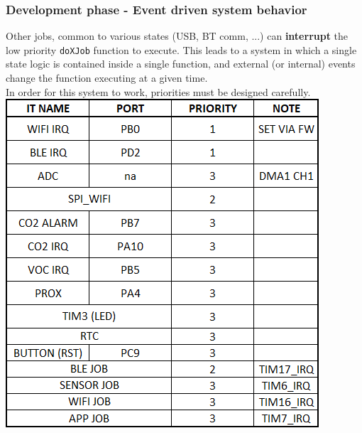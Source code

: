 \documentclass[11pt,xcolor=table,aspectratio=169]{beamer}
\begin{document}
	\begin{frame}
		\frametitle{Development phase - Event driven system behavior}
		Other jobs, common to various states (USB, BT comm, ...) can \textbf{interrupt} the low priority \texttt{doXJob} function to execute. This leads to a system in which a single state logic is contained inside a single function, and external (or internal) events change the function executing at a given time.\\ In order for this system to work, priorities must be designed carefully.\\
		\vspace{.1cm}\centering\includegraphics[width=.27\textwidth]{media/priorities.png}
	\end{frame}
\end{document}
